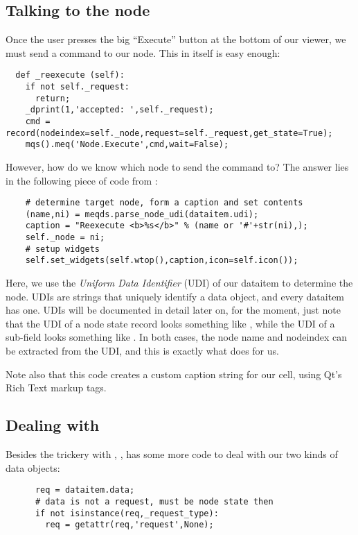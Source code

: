 \documentclass[12pt,twoside]{book}
\begin{document}
\subsection{Talking to the node}

  Once the user presses the big ``Execute'' button at the bottom of our viewer, we
  must send a command to our node. This in itself is easy enough:

\begin{verbatim}  
  def _reexecute (self):
    if not self._request:
      return;
    _dprint(1,'accepted: ',self._request);
    cmd = record(nodeindex=self._node,request=self._request,get_state=True);
    mqs().meq('Node.Execute',cmd,wait=False);
\end{verbatim}  

  However, how do we know which node to send the command to? The answer lies in
  the following piece of code from :

\begin{verbatim}  
    # determine target node, form a caption and set contents
    (name,ni) = meqds.parse_node_udi(dataitem.udi);
    caption = "Reexecute <b>%s</b>" % (name or '#'+str(ni),);
    self._node = ni;
    # setup widgets
    self.set_widgets(self.wtop(),caption,icon=self.icon());
\end{verbatim}  

  Here, we use the {\em Uniform Data Identifier} (UDI) of our dataitem to
  determine the node. UDIs are strings that uniquely identify a data object, and
  every dataitem has one. UDIs will be documented in detail later on, for the
  moment, just note that the UDI of a node state record looks something like
  , while the UDI of a sub-field looks something like
  . In both cases, the node name and nodeindex
  can be extracted from the UDI, and this is exactly what
   does for us.
  
  Note also that this code creates a custom caption string for our cell, using
  Qt's Rich Text markup tags. 

\subsection{Dealing with }
  
  Besides the trickery with , , has some more
  code to deal with our two kinds of data objects:

\begin{verbatim}  
      req = dataitem.data;
      # data is not a request, must be node state then
      if not isinstance(req,_request_type):
        req = getattr(req,'request',None);
\end{verbatim}  
  
\end{document}
